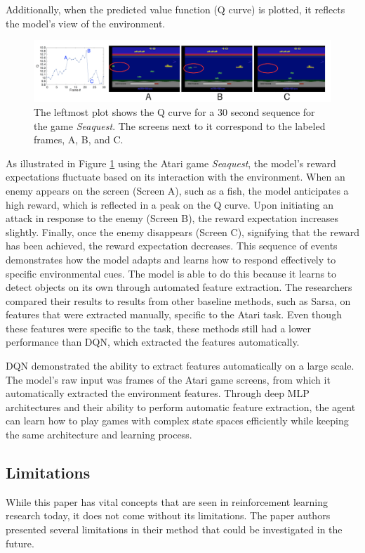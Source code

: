 \documentclass{article}
\begin{document}
Additionally, when the predicted value function (Q curve) is plotted, it reflects the model's view of the environment. 

\begin{figure}[H]
    \centering
    \includegraphics[width=0.75\linewidth]{qcurve.png}
    \caption{The leftmost plot shows the Q curve for a 30 second sequence for the game \textit{Seaquest}. The screens next to it correspond to the labeled frames, A, B, and C.}
    \label{fig:qcurve}
\end{figure}

\vspace{-0.5cm}As illustrated in Figure \ref{fig:qcurve} using the Atari game \textit{Seaquest}, the model's reward expectations fluctuate based on its interaction with the environment. When an enemy appears on the screen (Screen A), such as a fish, the model anticipates a high reward, which is reflected in a peak on the Q curve. Upon initiating an attack in response to the enemy (Screen B), the reward expectation increases slightly. Finally, once the enemy disappears (Screen C), signifying that the reward has been achieved, the reward expectation decreases. This sequence of events demonstrates how the model adapts and learns how to respond effectively to specific environmental cues. The model is able to do this because it learns to detect objects on its own through automated feature extraction. The researchers compared their results to results from other baseline methods, such as Sarsa, on features that were extracted manually, specific to the Atari task. Even though these features were specific to the task, these methods still had a lower performance than DQN, which extracted the features automatically.

DQN demonstrated the ability to extract features automatically on a large scale. The model’s raw input was frames of the Atari game screens, from which it automatically extracted the environment features. Through deep MLP architectures and their ability to perform automatic feature extraction, the agent can learn how to play games with complex state spaces efficiently while keeping the same architecture and learning process. 

\subsection{Limitations}
While this paper has vital concepts that are seen in reinforcement learning research today, it does not come without its limitations. The paper authors presented several limitations in their method that could be investigated in the future. 
\end{document}
